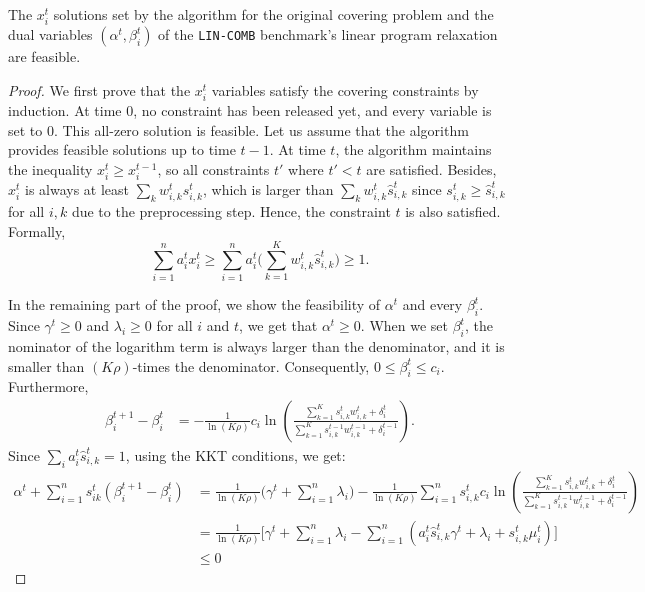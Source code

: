 \begin{lemma}
    The $x_{i}^{t}$ solutions set by the algorithm for the original covering problem and the dual variables $(\alpha^{t}, \beta_{i}^{t})$ of the \texttt{LIN-COMB} benchmark's linear program relaxation are feasible.
\end{lemma}
    \begin{proof}
    We first prove that the $x_{i}^{t}$ variables satisfy the covering constraints by induction. At time 0, no constraint has been released yet, and every variable is set to 0. This all-zero solution is feasible. Let us assume that the algorithm provides feasible solutions up to time $t-1$. At time $t$, the algorithm maintains the inequality $x_{i}^{t} \geq x_{i}^{t-1}$, so all constraints $t'$ where $t' < t$ are satisfied. Besides, $x_{i}^{t}$ is always at least
    $\sum_{k} w_{i,k}^{t} s_{i,k}^{t}$, which is larger than $\sum_{k} w_{i,k}^{t} \hat{s}_{i,k}^{t}$ since $s_{i,k}^{t} \geq \hat{s}_{i,k}^{t}$
    for all $i,k$ due to the preprocessing step. Hence, the constraint $t$ is also satisfied. Formally,
    $$
    \sum_{i=1}^{n} a_{i}^{t} x_{i}^{t}  \geq \sum_{i=1}^{n} a_{i}^{t} \biggl( \sum_{k=1}^{K} w_{i,k}^{t}  \hat{s}_{i,k}^{t} \biggr) \geq 1.
    $$

    In the remaining part of the proof, we show the feasibility of $\alpha^{t}$ and every $\beta_{i}^{t}$.
    Since $ \gamma^{t} \geq 0$ and $\lambda_{i} \geq 0$ for all $i$ and $t$, we get that $\alpha^{t} \geq 0$.
    When we set $\beta_{i}^{t}$, the nominator of the logarithm term is always larger than the denominator, and it is smaller than $(K\rho)$-times the denominator. Consequently, $0 \leq \beta_{i}^{t} \leq c_{i}$. Furthermore,
    \begin{align*}
        \beta_{i}^{t+1} - \beta_{i}^{t}
            &= - \frac{1}{\ln(K\rho)} c_i \ln \left( \frac{\sum_{k=1}^{K}  s_{i,k}^{t} w_{i,k}^{t} + \delta_{i}^{t}}{\sum_{k=1}^{K}  s_{i,k}^{t-1}w_{i,k}^{t-1} + \delta_{i}^{t-1}} \right).
    \end{align*}
    Since $\sum_{i} a_{i}^{t} \hat{s}_{i,k}^{t} = 1$, using the KKT conditions, we get:
    \begin{align*}
    \alpha^{t} + \sum_{i=1}^{n} s_{ik}^{t} \left(\beta_{i}^{t+1} - \beta_{i}^{t}\right)
    &= \frac{1}{\ln(K\rho)} \biggl( \gamma^{t} + \sum_{i=1}^{n} \lambda_{i} \biggr)
        - \frac{1}{\ln(K\rho)}  \sum_{i=1}^{n} s_{i,k}^{t} c_i \ln \left( \frac{\sum_{k=1}^{K}  s_{i,k}^{t} w_{i,k}^{t} + \delta_{i}^{t}}{\sum_{k=1}^{K}  s_{i,k}^{t-1}w_{i,k}^{t-1} + \delta_{i}^{t-1}} \right) \\
    &= \frac{1}{\ln(K\rho)} \biggl[ \gamma^{t} + \sum_{i=1}^{n} \lambda_{i} - \sum_{i=1}^{n} \left( a_{i}^{t} \hat{s}_{i,k}^{t} \gamma^{t} + \lambda_{i} + s_{i,k}^{t} \mu_{i}^{t} \right) \biggr] \\
    &\leq 0
    \end{align*}
\end{proof}
